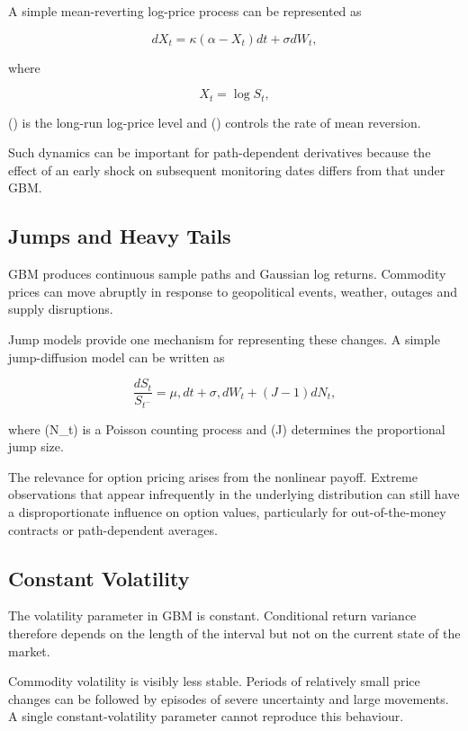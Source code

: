 \documentclass[12pt,a4paper]{report}
\begin{document}
A simple mean-reverting log-price process can be represented as

\begin{equation}
dX_t
=
\kappa(\alpha-X_t)dt
+
\sigma dW_t,
\end{equation}

where

\begin{equation}
X_t
=
\log S_t,
\end{equation}

(\alpha) is the long-run log-price level and (\kappa) controls the rate of mean reversion.

Such dynamics can be important for path-dependent derivatives because the effect of an early shock on subsequent monitoring dates differs from that under GBM.

\subsection{Jumps and Heavy Tails}

GBM produces continuous sample paths and Gaussian log returns. Commodity prices can move abruptly in response to geopolitical events, weather, outages and supply disruptions.

Jump models provide one mechanism for representing these changes. A simple jump-diffusion model can be written as

\begin{equation}
\frac{dS_t}{S_{t^-}}
=
\mu,dt
+
\sigma,dW_t
+
(J-1)dN_t,
\end{equation}

where (N_t) is a Poisson counting process and (J) determines the proportional jump size.

The relevance for option pricing arises from the nonlinear payoff. Extreme observations that appear infrequently in the underlying distribution can still have a disproportionate influence on option values, particularly for out-of-the-money contracts or path-dependent averages.

\subsection{Constant Volatility}

The volatility parameter in GBM is constant. Conditional return variance therefore depends on the length of the interval but not on the current state of the market.

Commodity volatility is visibly less stable. Periods of relatively small price changes can be followed by episodes of severe uncertainty and large movements. A single constant-volatility parameter cannot reproduce this behaviour.
\end{document}
